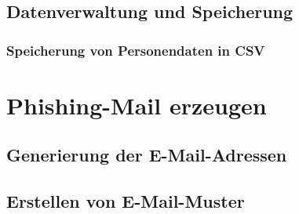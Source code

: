 	\subsection{Datenverwaltung und Speicherung}
	\subsubsection{Speicherung von Personendaten in CSV}

\section{Phishing-Mail erzeugen}
	\subsection{Generierung der E-Mail-Adressen}
	\subsection{Erstellen von E-Mail-Muster}

